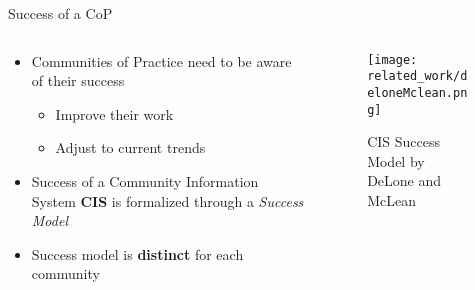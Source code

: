 \begin{frame}{Success of a CoP}
  \begin{columns}
    \begin{column}[]{0.3\textwidth}
      \begin{itemize}
        \item Communities of Practice need to be aware of their success
              \begin{itemize}
                \item Improve their work
                \item Adjust to current trends
              \end{itemize}
              \item Success of a Community Information System \textbf{CIS} is formalized through a \emph{Success Model}
              \item Success model is \textbf{distinct} for each community
      \end{itemize}
    \end{column}
    \begin{column}[]{0.7\textwidth}
      \begin{figure}
        \centering
        \texttt{[image: related\_work/deloneMclean.png]}
        \caption{CIS Success Model by DeLone and McLean \cite{DeMc92}}
      \end{figure}
    \end{column}
  \end{columns}
\end{frame}



